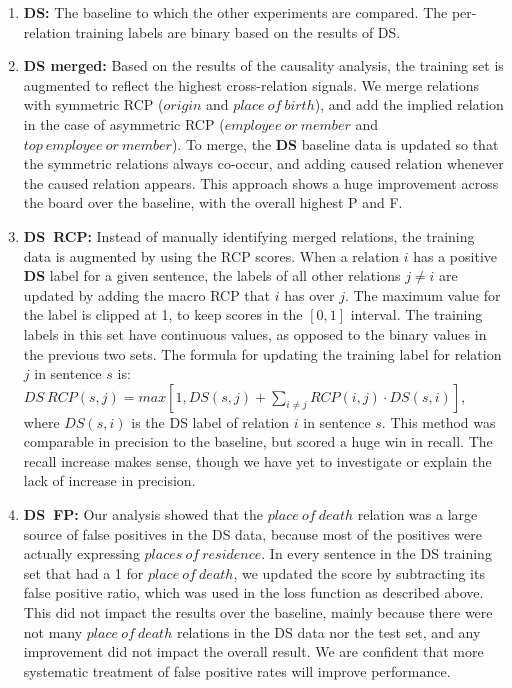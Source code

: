 \begin{enumerate}

\item \textbf{DS:} The baseline to which the other experiments are compared. The per-relation training labels are binary based on the results of DS.

\item \textbf{DS merged:} Based on the results of the causality analysis, the training set is augmented to reflect the highest cross-relation signals.  We merge relations with symmetric RCP ($origin$ and $place\ of\ birth$), and add the implied relation in the case of asymmetric RCP ($employee\ or\ member$  and $top\ employee\ or\ member$). To merge, the \textbf{DS} baseline data is updated so that the symmetric relations always co-occur, and adding caused relation whenever the caused relation appears. This approach shows a huge improvement across the board over the baseline, with the overall highest P and F.

\item \textbf{DS\ RCP:} Instead of manually identifying merged relations, the training data is augmented by using the RCP scores. When a relation $i$ has a positive \textbf{DS} label for a given sentence, the labels of all other relations $j \neq i$ are updated by adding the macro RCP that $i$ has over $j$. The maximum value for the label is clipped at 1, to keep scores in the $[0,1]$ interval. The training labels in this set have continuous values, as opposed to the binary values in the previous two sets. The formula for updating the training label for relation $j$ in sentence $s$ is: $ DS\ RCP(s, j) = max[1, DS(s, j) + \sum_{i \neq j} RCP(i,j) \cdot DS(s,i) ],$ where $DS(s,i)$ is the DS label of relation $i$ in sentence $s$.  This method was comparable in precision to the baseline, but scored a huge win in recall.  The recall increase makes sense, though we have yet to investigate or explain the lack of increase in precision.

\item \textbf{DS\ FP:} Our analysis showed that the $place\ of\ death$ relation was a large source of false positives in the DS data, because most of the positives were actually expressing $places\ of\ residence$.  In every sentence in the DS training set that had a 1 for $place\ of\ death$, we updated the score by subtracting its false positive ratio, which was used in the loss function as described above.  This did not impact the results over the baseline, mainly because there were not many $place\ of\ death$ relations in the DS data nor the test set, and any improvement did not impact the overall result.  We are confident that more systematic treatment of false positive rates will improve performance.

\end{enumerate}

